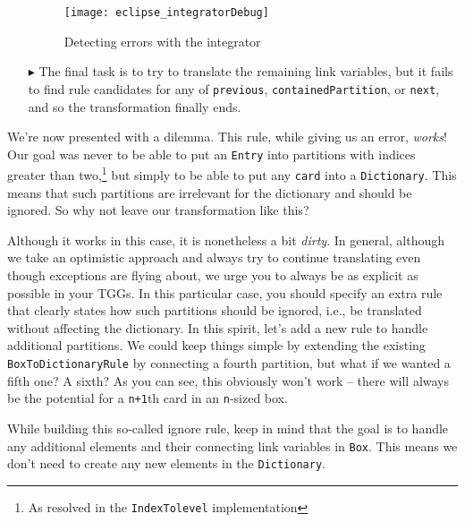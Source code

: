 \begin{itemize}
\begin{figure}[htb]
\begin{center}
  \texttt{[image: eclipse\_integratorDebug]}
  \caption{Detecting errors with the integrator}
  \label{eclipse:integrator_debugSuccess}
\end{center}
\end{figure}

\item[$\blacktriangleright$] The final task is to try to translate the remaining link variables, but it fails to find rule candidates for any of
\texttt{previous}, \texttt{containedPartition}, or \texttt{next}, and so the transformation finally ends.

\end{itemize}

We're now presented with a dilemma. This rule, while giving us an error, \emph{works}! Our goal was never to be able to put an \texttt{Entry} into
partitions with indices greater than two,\footnote{As resolved in the \texttt{IndexTolevel} implementation} but simply to be able to put any \texttt{card} into
a \texttt{Dictionary}. This means that such partitions are irrelevant for the dictionary and should be ignored. So why not leave our transformation like this?

Although it works in this case, it is nonetheless a bit \emph{dirty}. In general, although we take an optimistic approach and always try to continue
translating even though exceptions are flying about, we urge you to always be as explicit as possible in your TGGs. In this particular case, you should specify
an extra rule that clearly states how such partitions should be ignored, i.e., be translated without affecting the dictionary. In this spirit, let's add a new
rule to handle additional partitions. We could keep things simple by extending the existing \texttt{BoxToDictionaryRule} by connecting a fourth partition, but
what if we wanted a fifth one? A sixth? As you can see, this obviously won't work -- there will always be the potential for a \texttt{n+1}th card in an \texttt{n}-sized box. 

While building this so-called ignore rule, keep in mind that the goal is to handle any additional elements and their connecting link variables in \texttt{Box}.
This means we don't need to create any new elements in the \texttt{Dictionary}.






